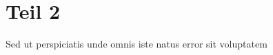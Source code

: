 %
%
%
%
\section{Teil 2 
\label{openfoam:section:teil2}}
Sed ut perspiciatis unde omnis iste natus error sit voluptatem
